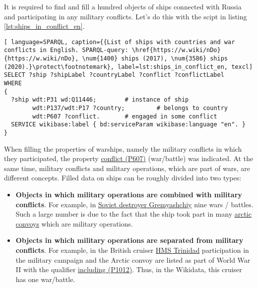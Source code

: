 It is required to find and fill a hundred objects of ships connected with Russia and participating in any military conflicts. Let's do this with the scipt in listing \ref{lst:ships_in_conflict_en}.
\begin{lstlisting}[ language=SPARQL, caption={{List of ships with countries and war conflicts in English. SPARQL-query: \href{https://w.wiki/nDo}{https://w.wiki/nDo}, \num{1400} ships (2017), \num{3586} ships (2020).}\protect\footnotemark}, label=lst:ships_in_conflict_en, texcl]
SELECT ?ship ?shipLabel ?countryLabel ?conflict ?conflictLabel
WHERE
{
  ?ship wdt:P31 wd:Q11446;        # instance of ship
        wdt:P137/wdt:P17 ?country;         # belongs to country
        wdt:P607 ?conflict.       # engaged in some conflict
  SERVICE wikibase:label { bd:serviceParam wikibase:language "en". }
}
\end{lstlisting}


\label{question:ship_2}

When filling the properties of warships, namely the military conflicts in which they participated, the property \href{https://www.wikidata.org/wiki/Property:P607}{conflict (P607)} (war/battle) was indicated. At the same time, military conflicts and military operations, which are part of wars, are different concepts. Filled data on ships can be roughly divided into two types:
\begin{itemize}
  \item \textbf{Objects in which military operations are combined with military conflicts}. For example, in \href{https://www.wikidata.org/wiki/Q4148613}{Soviet destroyer Gremyashchiy} nine wars / battles. Such a large number is due to the fact that the ship took part in many \href{https://en.wikipedia.org/wiki/Arctic_convoys_of_World_War_II}{arctic convoys} which are military operations.
  \item \textbf{Objects in which military operations are separated from military conflicts}. For example, in the British cruiser \href{https://en.wikipedia.org/wiki/HMS_Trinidad_(1940)}{HMS Trinidad} participation in the military campaign and the Arctic convoy are listed as part of World War II with the qualifier \href{https://www.wikidata.org/wiki/Property:P1012}{including (P1012)}. Thus, in the Wikidata, this cruiser has one war/battle.
\end{itemize}


